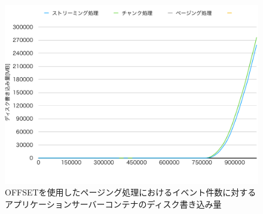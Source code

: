 \documentclass[../../../../../main]{subfiles}
\begin{document}
    \begin{figure}[H]
        \centering
        \includegraphics[width=12cm]{graph}
        \caption{OFFSETを使用したページング処理におけるイベント件数に対するアプリケーションサーバーコンテナのディスク書き込み量}
        \label{fig:each-way-app-disk-in-app_1_1024-db_1_1024}
    \end{figure}
\end{document}
